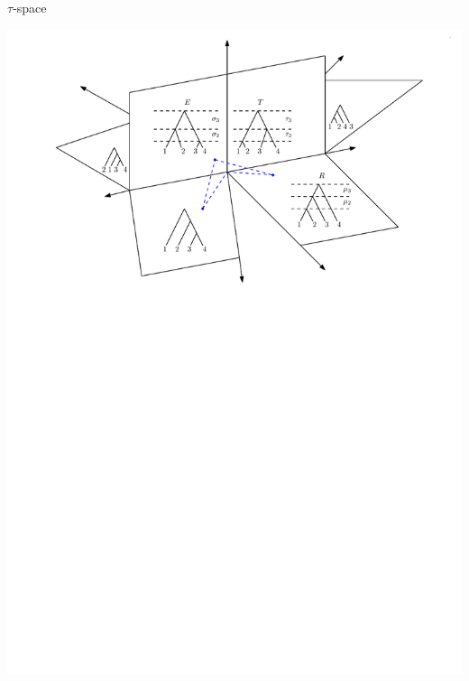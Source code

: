 \documentclass{beamer}
\begin{document}
\begin{frame}{$\tau$-space}
\begin{definition}
\includegraphics[width=\framewidth]{tauSpace}
\end{definition}
\end{frame}
\end{document}

